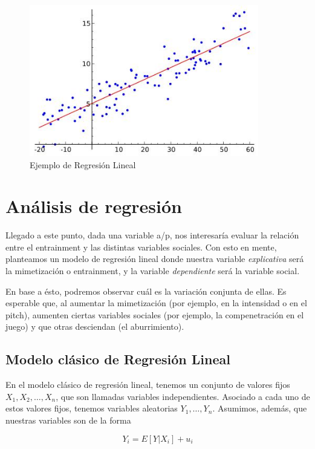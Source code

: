 
\begin{figure}[h]
\centering
\includegraphics[width=10cm]{images/linear_regression.jpg}
\caption{Ejemplo de Regresión Lineal}
\end{figure}

\section{Análisis de regresión}

Llegado a este punto, dada una variable a/p, nos interesaría evaluar la relación entre el entrainment y las distintas variables sociales. Con esto en mente, planteamos un modelo de regresión lineal donde nuestra variable \emph{explicativa} será la mimetización o entrainment, y la variable \emph{dependiente} será la variable social.

En base a ésto, podremos observar cuál es la variación conjunta de ellas. Es esperable que, al aumentar la mimetización (por ejemplo, en la intensidad o en el pitch), aumenten ciertas variables sociales (por ejemplo, la compenetración en el juego) y que otras desciendan (el aburrimiento).


\subsection{Modelo clásico de Regresión Lineal}

En el modelo clásico de regresión lineal, tenemos un conjunto de valores fijos $X_1, X_2, \ldots, X_n$, que son llamadas variables independientes. Asociado a cada uno de estos valores fijos, tenemos variables aleatorias $Y_1, \ldots, Y_n$. Asumimos, además, que nuestras variables son de la forma

\begin{equation}
  Y_i = E[Y|X_i] + u_i
\end{equation}

